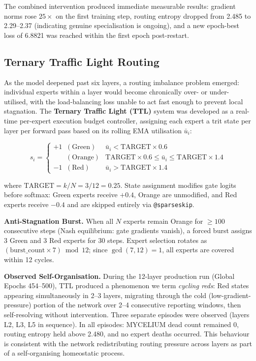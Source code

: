 \documentclass[journal,10pt,twocolumn]{IEEEtran}
\begin{document}
The combined intervention produced immediate measurable results: gradient norms
rose $25\times$ on the first training step, routing entropy dropped from 2.485
to 2.29--2.37 (indicating genuine specialisation is ongoing), and a new
epoch-best loss of 6.8821 was reached within the first epoch post-restart.

\subsection{Ternary Traffic Light Routing}
\label{subsec:ttl}

As the model deepened past six layers, a routing imbalance problem emerged:
individual experts within a layer would become chronically over- or
under-utilised, with the load-balancing loss unable to act fast enough to
prevent local stagnation. The \textbf{Ternary Traffic Light (TTL)} system was
developed as a real-time per-expert execution budget controller, assigning
each expert a trit state per layer per forward pass based on its rolling EMA
utilisation $\bar{u}_i$:

\begin{equation}
  s_i = \begin{cases}
    {+1}\;\;(\text{Green})  & \bar{u}_i < \text{TARGET} \times 0.6 \\
    \phantom{+0}\;\;(\text{Orange}) & \text{TARGET} \times 0.6 \leq \bar{u}_i \leq \text{TARGET} \times 1.4 \\
    {-1}\;\;(\text{Red})    & \bar{u}_i > \text{TARGET} \times 1.4
  \end{cases}
\end{equation}

\noindent where $\text{TARGET} = k/N = 3/12 = 0.25$. State assignment modifies
gate logits before softmax: Green experts receive $+0.4$, Orange are unmodified,
and Red experts receive $-0.4$ and are skipped entirely via \texttt{@sparseskip}.

\textbf{Anti-Stagnation Burst.}
When all $N$ experts remain Orange for $\geq 100$ consecutive steps (Nash
equilibrium: gate gradients vanish), a forced burst assigns 3 Green and 3 Red
experts for 30 steps. Expert selection rotates as $(\text{burst\_count} \times
7)\bmod 12$; since $\gcd(7, 12) = 1$, all experts are covered within 12 cycles.

\textbf{Observed Self-Organisation.}
During the 12-layer production run (Global Epochs 454--500), TTL produced a
phenomenon we term \emph{cycling reds}: Red states appearing simultaneously in
2--3 layers, migrating through the cold (low-gradient-pressure) portion of the
network over 2--4 consecutive reporting windows, then self-resolving without
intervention. Three separate episodes were observed (layers L2, L3, L5 in
sequence). In all episodes: MYCELIUM dead count remained 0, routing entropy
held above 2.480, and no expert deaths occurred. This behaviour is consistent
with the network redistributing routing pressure across layers as part of a
self-organising homeostatic process.
\end{document}
